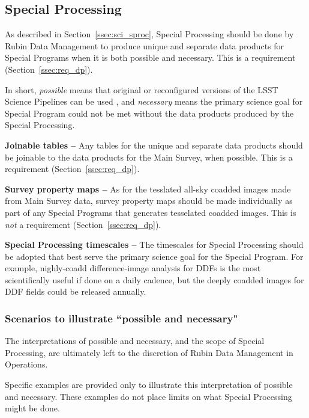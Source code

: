 \subsection{Special Processing}\label{ssec:proc_special}

As described in Section~\ref{ssec:sci_sproc}, 
Special Processing should be done by Rubin Data Management to 
produce unique and separate data products
for Special Programs when it is both possible and necessary.
This is a requirement (Section~\ref{ssec:req_dp}).

In short, \emph{possible} means that original or reconfigured versions of the LSST
Science Pipelines can be used , and \emph{necessary} means the primary science goal for Special Program
could not be met without the data products produced by the Special Processing.

\textbf{Joinable tables --}
Any tables for the unique and separate data products should be joinable to the 
data products for the Main Survey, when possible.
This is a requirement (Section~\ref{ssec:req_dp}).

\textbf{Survey property maps --}
As for the tesslated all-sky coadded images made from Main Survey data, survey property maps
should be made individually as part of any Special Programs that generates
tesselated coadded images. This is \emph{not} a requirement (Section~\ref{ssec:req_dp}).

\textbf{Special Processing timescales --}
The timescales for Special Processing should be adopted that best serve the
primary science goal for the Special Program.
For example, nighly-coadd difference-image analysis for DDFs is the most
scientifically useful if done on a daily cadence, but the deeply coadded
images for DDF fields could be released annually.

\subsubsection{Scenarios to illustrate ``possible and necessary"}

The interpretations of possible and necessary, and the scope of Special Processing,
are ultimately left to the discretion of Rubin Data Management in Operations.

Specific examples are provided only to illustrate this interpretation of possible and necessary.
These examples do not place limits on what Special Processing might be done.

